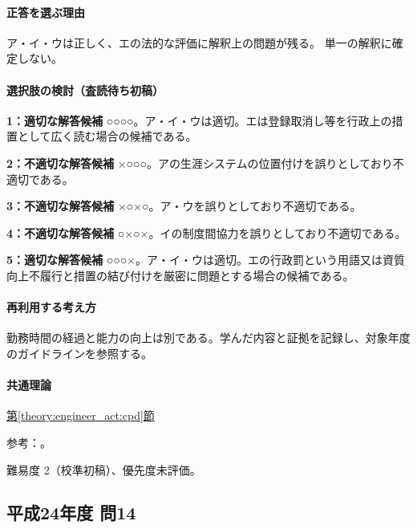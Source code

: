 \paragraph{正答を選ぶ理由} ア・イ・ウは正しく、エの法的な評価に解釈上の問題が残る。 単一の解釈に確定しない。

\paragraph{選択肢の検討（査読待ち初稿）}

\noindent\textbf{1：適切な解答候補} ○○○○。ア・イ・ウは適切。エは登録取消し等を行政上の措置として広く読む場合の候補である。\par

\noindent\textbf{2：不適切な解答候補} ×○○○。アの生涯システムの位置付けを誤りとしており不適切である。\par

\noindent\textbf{3：不適切な解答候補} ×○×○。ア・ウを誤りとしており不適切である。\par

\noindent\textbf{4：不適切な解答候補} ○×○×。イの制度間協力を誤りとしており不適切である。\par

\noindent\textbf{5：適切な解答候補} ○○○×。ア・イ・ウは適切。エの行政罰という用語又は資質向上不履行と措置の結び付けを厳密に問題とする場合の候補である。\par

\paragraph{再利用する考え方} 勤務時間の経過と能力の向上は別である。学んだ内容と証拠を記録し、対象年度のガイドラインを参照する。

\paragraph{共通理論} \hyperref[theory:engineer_act:cpd]{第\ref*{theory:engineer_act:cpd}節}

\par 参考：\cite{engineer_act_current,cpd_v1}。

\par 難易度 2（校準初稿）、優先度未評価。

\subsection{平成24年度 問14}
\label{q:h24-reg-apt-14}

